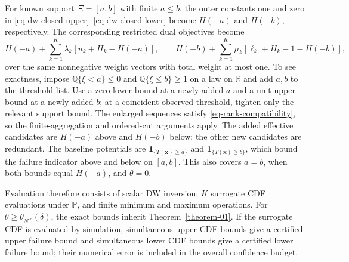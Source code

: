 \begin{remark}
  \label{rem-interval-support}
  For known support $\Xi=[a,b]$ with finite $a\le b$, the outer constants one and zero in \eqref{eq-dw-closed-upper}--\eqref{eq-dw-closed-lower} become $H(-a)$ and $H(-b)$, respectively. The corresponding restricted dual objectives become
  \[
    H(-a)+\sum_{k=1}^K\lambda_k\left[u_k+H_k-H(-a)\right],\qquad
    H(-b)+\sum_{k=1}^K\mu_k\left[\ell_k+H_k-1-H(-b)\right],
  \]
  over the same nonnegative weight vectors with total weight at most one. To see exactness, impose $\mathbb Q\{\xi<a\}\le0$ and $\mathbb Q\{\xi\le b\}\ge1$ on a law on $\mathbb R$ and add $a,b$ to the threshold list. Use a zero lower bound at a newly added $a$ and a unit upper bound at a newly added $b$; at a coincident observed threshold, tighten only the relevant support bound. The enlarged sequences satisfy \eqref{eq-rank-compatibility}, so the finite-aggregation and ordered-cut arguments apply. The added effective candidates are $H(-a)$ above and $H(-b)$ below; the other new candidates are redundant. The baseline potentials are $\mathbf1_{\{T(\bm x)\ge a\}}$ and $\mathbf1_{\{T(\bm x)\ge b\}}$, which bound the failure indicator above and below on $[a,b]$. This also covers $a=b$, when both bounds equal $H(-a)$, and $\theta=0$.
\end{remark}

Evaluation therefore consists of scalar DW inversion, $K$ surrogate CDF evaluations under $\mathbb P$, and finite minimum and maximum operations. For $\theta\ge\theta_{N^{\mathrm{te}}}(\delta)$, the exact bounds inherit Theorem~\ref{theorem-01}. If the surrogate CDF is evaluated by simulation, simultaneous upper CDF bounds give a certified upper failure bound and simultaneous lower CDF bounds give a certified lower failure bound; their numerical error is included in the overall confidence budget.
